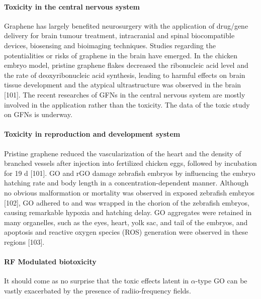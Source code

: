 \documentclass[twoside,twocolumn,9pt]{article}
\begin{document}
\paragraph{Toxicity in the central nervous system} Graphene has largely benefited neurosurgery with the application of drug/gene delivery for brain tumour treatment, intracranial and spinal biocompatible devices, biosensing and bioimaging techniques. Studies regarding the potentialities or risks of graphene in the brain have emerged. In the chicken embryo model, pristine graphene flakes decreased the ribonucleic acid level and the rate of deoxyribonucleic acid synthesis, leading to harmful effects on brain tissue development and the atypical ultrastructure was observed in the brain [101]. The recent researches of GFNs in the central nervous system are mostly involved in the application rather than the toxicity. The data of the toxic study on GFNs is underway.

\paragraph{Toxicity in reproduction and development system} Pristine graphene reduced the vascularization of the heart and the density of branched vessels after injection into fertilized chicken eggs, followed by incubation for 19 d [101]. GO and rGO damage zebrafish embryos by influencing the embryo hatching rate and body length in a concentration-dependent manner. Although no obvious malformation or mortality was observed in exposed zebrafish embryos [102], GO adhered to and was wrapped in the chorion of the zebrafish embryos, causing remarkable hypoxia and hatching delay. GO aggregates were retained in many organelles, such as the eyes, heart, yolk sac, and tail of the embryos, and apoptosis and reactive oxygen species (ROS) generation were observed in these regions [103].

\paragraph{RF Modulated biotoxicity} It should come as no surprise that the toxic effects latent in $\alpha$-type GO can be vastly exacerbated by the presence of radiio-frequency fields. 
\end{document}
